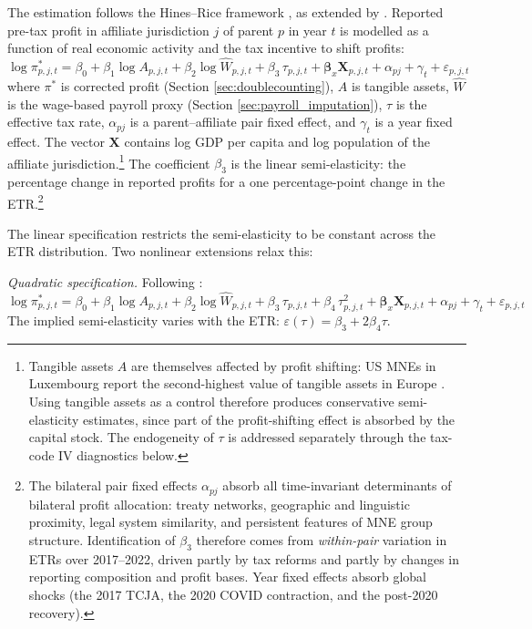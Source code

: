 \documentclass[11pt,a4paper]{article}
\begin{document}
The estimation follows the Hines--Rice framework \citep{hines1994}, as extended by \citet{garcia-bernardo2024}. Reported pre-tax profit in affiliate jurisdiction $j$ of parent $p$ in year $t$ is modelled as a function of real economic activity and the tax incentive to shift profits:
\begin{equation}\label{eq:panel_linear}
\log \pi_{p,j,t}^{*} = \beta_0 + \beta_1 \log A_{p,j,t} + \beta_2 \log \hat{W}_{p,j,t} + \beta_3 \, \tau_{p,j,t} + \mathbf{\beta}_x \mathbf{X}_{p,j,t} + \alpha_{pj} + \gamma_t + \varepsilon_{p,j,t}
\end{equation}
where $\pi^{*}$ is corrected profit (Section \ref{sec:doublecounting}), $A$ is tangible assets, $\hat{W}$ is the wage-based payroll proxy (Section \ref{sec:payroll_imputation}), $\tau$ is the effective tax rate, $\alpha_{pj}$ is a parent--affiliate pair fixed effect, and $\gamma_t$ is a year fixed effect. The vector $\mathbf{X}$ contains log GDP per capita and log population of the affiliate jurisdiction.\footnote{Tangible assets $A$ are themselves affected by profit shifting: US MNEs in Luxembourg report the second-highest value of tangible assets in Europe \citep{garcia-bernardo2024}. Using tangible assets as a control therefore produces conservative semi-elasticity estimates, since part of the profit-shifting effect is absorbed by the capital stock. The endogeneity of $\tau$ is addressed separately through the tax-code IV diagnostics below.} The coefficient $\beta_3$ is the linear semi-elasticity: the percentage change in reported profits for a one percentage-point change in the ETR.\footnote{The bilateral pair fixed effects $\alpha_{pj}$ absorb all time-invariant determinants of bilateral profit allocation: treaty networks, geographic and linguistic proximity, legal system similarity, and persistent features of MNE group structure. Identification of $\beta_3$ therefore comes from \emph{within-pair} variation in ETRs over 2017--2022, driven partly by tax reforms and partly by changes in reporting composition and profit bases. Year fixed effects absorb global shocks (the 2017 TCJA, the 2020 COVID contraction, and the post-2020 recovery).}

The linear specification restricts the semi-elasticity to be constant across the ETR distribution. Two nonlinear extensions relax this:

\textit{Quadratic specification.} Following \citet{dowd2017}:
\begin{equation}\label{eq:panel_quadratic}
\log \pi_{p,j,t}^{*} = \beta_0 + \beta_1 \log A_{p,j,t} + \beta_2 \log \hat{W}_{p,j,t} + \beta_3 \, \tau_{p,j,t} + \beta_4 \, \tau_{p,j,t}^2 + \mathbf{\beta}_x \mathbf{X}_{p,j,t} + \alpha_{pj} + \gamma_t + \varepsilon_{p,j,t}
\end{equation}
The implied semi-elasticity varies with the ETR: $\varepsilon(\tau) = \beta_3 + 2\beta_4 \tau$.
\end{document}
